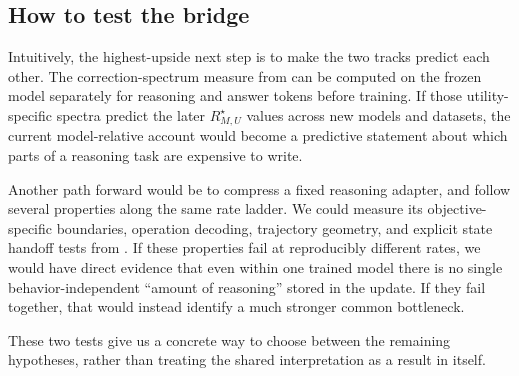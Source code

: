\subsection{How to test the bridge}

Intuitively, the highest-upside next step is to make the two tracks predict each other. The correction-spectrum measure from  can be computed on the frozen model separately for reasoning and answer tokens before training. If those utility-specific spectra predict the later $R^{\star}_{M,U}$ values across new models and datasets, the current model-relative account would become a predictive statement about which parts of a reasoning task are expensive to write.

Another path forward would be to compress a fixed reasoning adapter, and follow several properties along the same rate ladder. We could measure its objective-specific boundaries, operation decoding, trajectory geometry, and explicit state handoff tests from . If these properties fail at reproducibly different rates, we would have direct evidence that even within one trained model there is no single behavior-independent ``amount of reasoning'' stored in the update. If they fail together, that would instead identify a much stronger common bottleneck.

These two tests give us a concrete way to choose between the remaining hypotheses, rather than treating the shared interpretation as a result in itself.

\FloatBarrier

